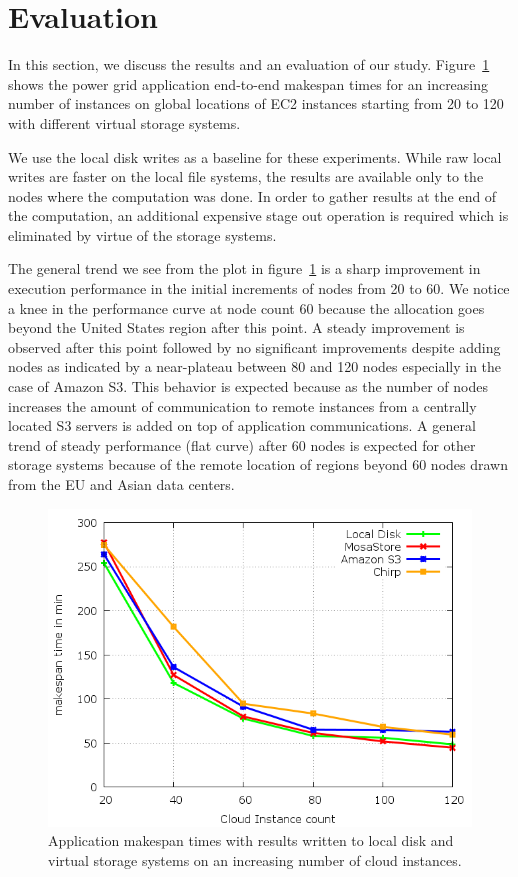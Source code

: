 \documentclass[10pt,journal,cspaper,compsoc]{IEEEtran}
\begin{document}
\section{Evaluation} \label{sec:appresults}
In this section, we discuss the results and an evaluation of our study.
Figure~\ref{fig:makespan} shows the power grid application end-to-end
makespan times for an increasing number of instances on global locations of EC2
instances starting from 20 to 120 with different virtual storage systems. 

We use the local disk writes as a baseline for these experiments. While raw
local writes are faster on the local file systems, the
results are available only to the nodes where the computation was done. In
order to gather results at the end of the computation, an additional expensive
stage out operation is required which is eliminated by virtue of the storage
systems.

The general trend we see from the plot in figure~\ref{fig:makespan} is a sharp
improvement in execution performance in the initial increments of nodes from 20
to 60. We notice a knee in the performance curve at node count 60 because the
allocation goes beyond the United States region after this point. A steady
improvement is observed after this point followed by no significant
improvements despite adding nodes as indicated by a near-plateau between 80 and
120 nodes especially in the case of Amazon S3. This behavior is expected
because as the number of nodes increases the amount of communication to remote
instances from a centrally located S3 servers is added on top of application
communications. A general trend of steady performance (flat curve) after 60
nodes is expected for other storage systems because of the remote location of
regions beyond 60 nodes drawn from the EU and Asian data centers.

\begin{figure}[htb]
\begin{center}
\includegraphics[width=\linewidth]{plots/makespan.png}
\caption{Application makespan times with results written to local disk and
virtual storage systems on an increasing number of cloud instances.
\label{fig:makespan}
}
\end{center}
\end{figure}
\end{document}
